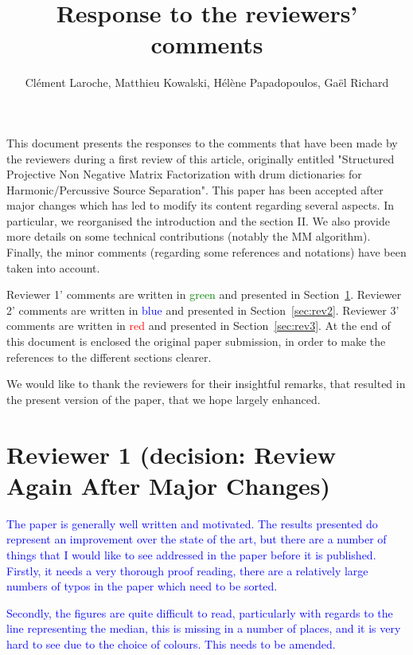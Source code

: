 \documentclass[]{article}
\title{Response to the reviewers' comments}
\author{Cl\'{e}ment Laroche, Matthieu Kowalski, H\'{e}l\`{e}ne Papadopoulos, Ga\"{e}l Richard}
\date{}
\begin{document}
\maketitle

This document presents the responses to the comments that have been made by the reviewers during a first review of this article, originally entitled "Structured Projective Non Negative Matrix Factorization with drum dictionaries for Harmonic/Percussive Source Separation". This paper has been accepted after major changes which has led to modify its content regarding several aspects. In particular, we reorganised the introduction and the section II. We also provide more details on some technical contributions (notably the MM algorithm). Finally, the minor comments (regarding some references and notations) have been taken into account.

Reviewer 1' comments are written in \textcolor{green}{green} and presented in Section~\ref{sec:rev1}. Reviewer 2' comments are written in \textcolor{blue}{blue} and presented in Section~\ref{sec:rev2}. Reviewer 3' comments are written in \textcolor{red}{red} and presented in Section~\ref{sec:rev3}. At the end of this document is enclosed the original paper submission, in order to make the references to the different sections clearer.

We would like to thank the reviewers for their insightful remarks, that resulted in the present version of the paper, that we hope largely enhanced.


\section{Reviewer 1 (decision: Review Again After Major Changes)}
\label{sec:rev1}

\textcolor{blue}{The paper is generally well written and motivated. The results presented do represent an improvement over the state of the art, but there are a number of things that I would like to see addressed in the paper before it is published. Firstly, it needs a very thorough proof reading, there are a relatively large numbers of typos in the paper which need to be sorted.}


\textcolor{blue}{Secondly, the figures are quite difficult to read, particularly with regards to the line representing the median, this is missing in a number of places, and it is very hard to see due to the choice of colours. This needs to be amended.}
\end{document}
